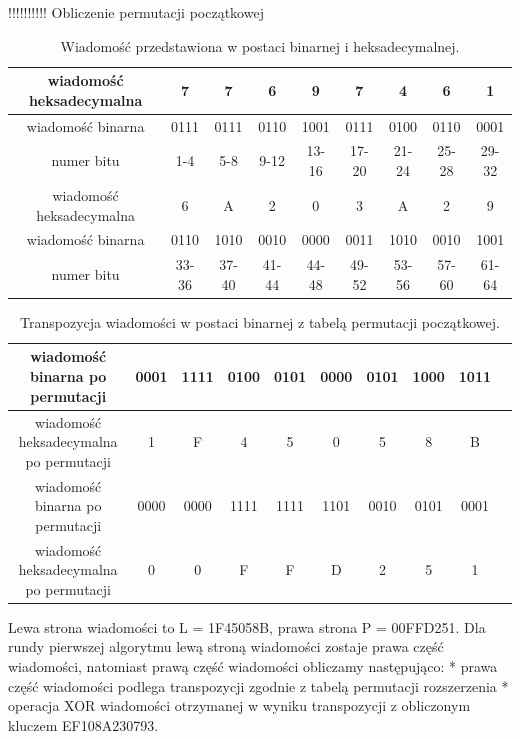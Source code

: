\documentclass[12p]{article}
\begin{document}
!!!!!!!!!! Obliczenie permutacji początkowej 

\begin{table}[!h]
\centering
\begin{tabular}{|c|c|c|c|c|c|c|c|c|}
\hline
wiadomość heksadecymalna & 7 & 7 & 6 & 9 & 7 & 4 & 6 & 1\\ \hline
wiadomość binarna & 0111 & 0111 & 0110 & 1001 & 0111 & 0100 & 0110 & 0001\\ \hline
numer bitu & 1-4 & 5-8 & 9-12 & 13-16 & 17-20 & 21-24 & 25-28 & 29-32\\ \hline
wiadomość heksadecymalna & 6 & A & 2 & 0 & 3 & A & 2 & 9\\ \hline
wiadomość binarna & 0110 & 1010 & 0010 & 0000 & 0011 & 1010 & 0010 & 1001\\ \hline
numer bitu & 33-36 & 37-40 & 41-44 & 44-48 & 49-52 & 53-56 & 57-60 & 61-64\\ \hline
\end{tabular}
\caption{Wiadomość przedstawiona w postaci binarnej i heksadecymalnej.}
\end{table}


\begin{table}[!h]
\centering
\begin{tabular}{|c|c|c|c|c|c|c|c|c|c|}
\hline
wiadomość binarna po permutacji & 0001 & 1111 & 0100 & 0101 & 0000 & 0101 & 1000 & 1011\\ \hline
wiadomość heksadecymalna po permutacji & 1 & F & 4 & 5 & 0 & 5 & 8 & B\\ \hline
wiadomość binarna po permutacji & 0000 & 0000 & 1111 & 1111 & 1101 & 0010 & 0101 & 0001\\ \hline
wiadomość heksadecymalna po permutacji & 0 & 0 & F & F & D & 2 & 5 & 1\\ \hline

\end{tabular}
\caption{Transpozycja wiadomości w postaci binarnej z tabelą permutacji początkowej.}
\end{table}



Lewa strona wiadomości to L = 1F45058B, prawa strona P = 00FFD251. 
Dla rundy pierwszej algorytmu lewą stroną wiadomości zostaje prawa część wiadomości, natomiast prawą część wiadomości obliczamy następująco:
*  prawa część wiadomości podlega transpozycji zgodnie z tabelą permutacji rozszerzenia 
* operacja XOR wiadomości otrzymanej w wyniku transpozycji z obliczonym kluczem EF108A230793.
\end{document}
